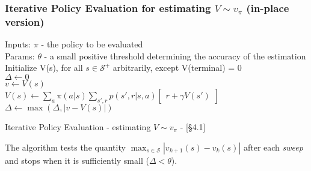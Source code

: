 \documentclass[10pt, landscape, a4paper]{article}
\begin{document}
\begin{multicols}{3}
        \subsubsection{Iterative Policy Evaluation for estimating $V \sim v_{\pi}$ (in-place version)}
        \begin{algorithm}[H]
            Inputs: $\pi$ - the policy to be evaluated \\
            Params: $\theta$ - a small positive threshold determining the accuracy of the estimation \\
            Initialize V(s), for all $s \in \mathcal{S}^{+}$ arbitrarily, except V(terminal) = 0\\
            $\Delta \leftarrow 0$ \\
            \While{$\Delta \ge \theta$}
            {
                 {
                    $v \leftarrow V(s)$\\
                    $V(s) \leftarrow \sum\limits_a \pi(a|s) \sum\limits_{s', r} p(s',r | s, a) \begin{bmatrix}
                                                                                                   r + \gamma V(s')
                    \end{bmatrix}$ \\
                    $\Delta \leftarrow \max(\Delta, | v - V(s)|)$
                }
            }
            \caption{Iterative Policy Evaluation - estimating $V \sim v_{\pi}$ - [§4.1]}
        \end{algorithm}

        The algorithm tests the quantity $\max_{s \in \mathcal{S}} |v_{k+1}(s) - v_k(s)|$ after each \emph{sweep} and stops when it is sufficiently small ($\Delta < \theta$).


\end{multicols}
\end{document}
